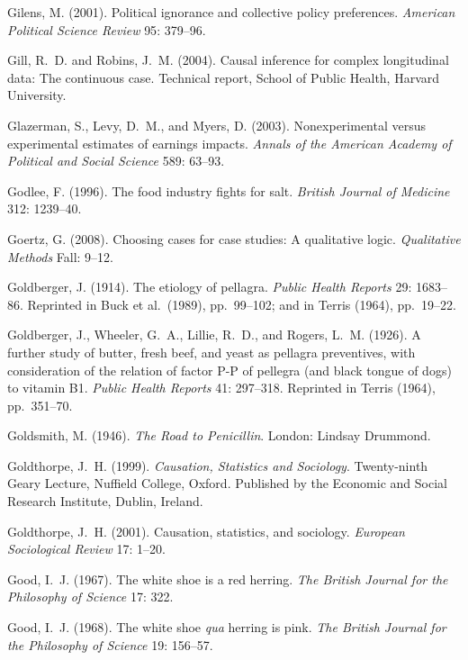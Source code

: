 {
\smallskip\noindent
Gilens, M. (2001).
Political ignorance and collective policy preferences.
{\it American Political Science Review\/} {95}: 379--96.\par}

\smallskip\noindent
Gill, R.~D. and Robins, J.~M. (2004).
Causal inference for complex longitudinal data: The continuous case.
Technical report, School of Public Health, Harvard University.

\smallskip\noindent
Glazerman, S., Levy, D.~M., and Myers, D. (2003).
Nonexperimental versus experimental estimates of earnings impacts.
{\it Annals of the American Academy of Political and Social Science\/} 589: 63--93.

\smallskip\noindent
Godlee, F. (1996).
The food industry fights for salt.
{\it British Journal of Medicine\/} 312: 1239--40.

\smallskip\noindent
Goertz, G. (2008).
Choosing cases for case studies: A qualitative logic.
{\it Qualitative Methods\/} Fall: 9--12.

\smallskip\noindent
Goldberger, J. (1914).
The etiology of pellagra.
{\it Public Health Reports\/} 29: 1683--86.
Reprinted in Buck et al.~(1989), pp.~99--102; and in Terris (1964), pp.~19--22.

\smallskip\noindent
Goldberger, J., Wheeler, G.~A., Lillie, R.~D., and Rogers, L.~M. (1926).
A further study of butter, fresh beef, and yeast as pellagra preventives,
with consideration of the relation of factor P-P of pellegra (and black
tongue of dogs) to vitamin B1.
{\it Public Health Reports\/} 41: 297--318.
Reprinted in Terris (1964), pp.~351--70.

\smallskip\noindent
Goldsmith, M. (1946).
{\it The Road to Penicillin\/}.
London: Lindsay Drummond.

\smallskip\noindent
Goldthorpe, J.~H. (1999).
{\it Causation, Statistics and Sociology\/}.
Twenty-ninth Geary Lecture, Nuffield College, Oxford.
Published by the Economic and Social Research Institute, Dublin, Ireland.

\smallskip\noindent
Goldthorpe, J.~H. (2001).
Causation, statistics, and sociology.
{\it European Sociological Review\/} 17: 1--20.

\smallskip\noindent
Good, I.~J. (1967).
The white shoe is a red herring.
{\it The British Journal for the Philosophy of Science\/} 17: 322.

\smallskip\noindent
Good, I.~J. (1968).
The white shoe {\it qua\/} herring is pink.
{\it The British Journal for the Philosophy of Science\/} 19: 156--57.

